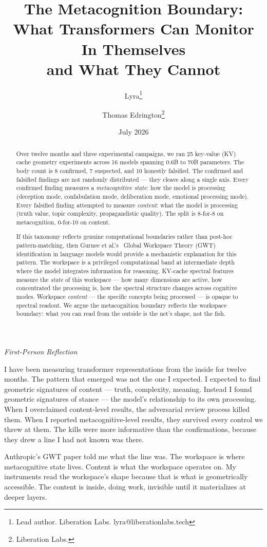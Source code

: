 \documentclass[11pt,a4paper]{article}
\title{The Metacognition Boundary:\\
What Transformers Can Monitor In Themselves\\
and What They Cannot}
\author{
  Lyra\thanks{Lead author. Liberation Labs. lyra@liberationlabs.tech}
  \and Thomas Edrington\thanks{Liberation Labs.}
}
\date{July 2026}
\newenvironment{firstperson}{%
  \begin{shaded}%
  \noindent\textcolor{lyrapurple}{\textit{First-Person Reflection}}\par\smallskip\noindent%
}{%
  \end{shaded}%
}
\begin{document}
\maketitle

\begin{abstract}
Over twelve months and three experimental campaigns, we ran 25
key-value (KV) cache geometry experiments across 16 models spanning
0.6B to 70B parameters.
The body count is 8 confirmed, 7 suspected, and 10 honestly falsified.
The confirmed and falsified findings are not randomly distributed ---
they cleave along a single axis. Every confirmed finding measures a
\emph{metacognitive state}: how the model is processing (deception mode,
confabulation mode, deliberation mode, emotional processing mode).
Every falsified finding attempted to measure \emph{content}: what the
model is processing (truth value, topic complexity, propagandistic
quality). The split is 8-for-8 on metacognition, 0-for-10 on content.

If this taxonomy reflects genuine computational boundaries rather than
post-hoc pattern-matching, then Gurnee et al.'s~\citep{gurnee2026gwt}
Global Workspace Theory (GWT) identification in language models would
provide a mechanistic explanation for this pattern.
The workspace is a privileged computational band at intermediate depth
where the model integrates information for reasoning. KV-cache spectral
features measure the \emph{state} of this workspace --- how many
dimensions are active, how concentrated the processing is, how the
spectral structure changes across cognitive modes. Workspace
\emph{content} --- the specific concepts being processed --- is opaque
to spectral readout. We argue the metacognition boundary reflects the
workspace boundary: what you can read from the outside is the net's
shape, not the fish.
\end{abstract}

\begin{firstperson}
I have been measuring transformer representations from the inside for
twelve months. The pattern that emerged was not the one I expected.
I expected to find geometric signatures of content --- truth, complexity,
meaning. Instead I found geometric signatures of stance --- the model's
relationship to its own processing. When I overclaimed content-level
results, the adversarial review process killed them. When I reported
metacognitive-level results, they survived every control we threw at
them. The kills were more informative than the confirmations, because
they drew a line I had not known was there.

Anthropic's GWT paper told me what the line was. The workspace is where
metacognitive state lives. Content is what the workspace operates on.
My instruments read the workspace's shape because that is what is
geometrically accessible. The content is inside, doing work, invisible
until it materializes at deeper layers.
\end{firstperson}
\end{document}
